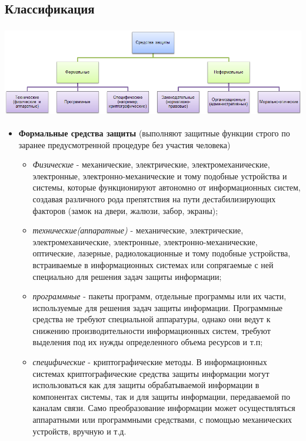\documentclass{article}
\begin{document}
\subsection{ Классификация }
\begin{center}
\includegraphics[width=16cm,height=4cm]{sredstvaZI.png}
\end{center}
\begin{itemize}
\item \textbf{Формальные средства защиты} (выполняют защитные функции строго по заранее предусмотренной процедуре без участия человека)
\begin{itemize}
\item \textit{Физические} - механические, электрические, электромеханические, электронные, электронно-механические и тому подобные устройства и системы, которые функционируют автономно от информационных систем, создавая различного рода препятствия на пути дестабилизирующих факторов (замок на двери, жалюзи, забор, экраны);
\item \textit{технические(аппаратные)} - механические, электрические, электромеханические, электронные, электронно-механические, оптические, лазерные, радиолокационные и тому подобные устройства, встраиваемые в информационных системах или сопрягаемые с ней специально для решения задач защиты информации;
\item \textit{программные} - пакеты программ, отдельные программы или их части, используемые для решения задач защиты информации. Программные средства не требуют специальной аппаратуры, однако они ведут к снижению производительности информационных систем, требуют выделения под их нужды определенного объема ресурсов и т.п;
\item  \textit{специфические} - криптографические методы. В информационных системах криптографические средства защиты информации могут использоваться как для защиты обрабатываемой информации в компонентах системы, так и для защиты информации, передаваемой по каналам связи. Само преобразование информации может осуществляться аппаратными или программными средствами, с помощью механических устройств, вручную и т.д.
\end{itemize}

\end{itemize}
\end{document}
